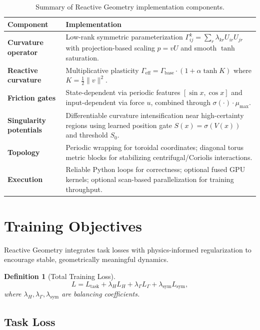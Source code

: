 \documentclass[12pt,letterpaper,twoside]{article}
\newtheorem{definition}{Definition}[section]
\begin{document}
\begin{table}[htbp]
\centering
\begin{tabular}{lp{}}
\toprule
Component & Implementation \\
\midrule
\textbf{Curvature operator} & Low-rank symmetric parameterization $\Gamma^k_{ij} = \sum_r \lambda_{kr} U_{ir} U_{jr}$ with projection-based scaling $p = vU$ and smooth $\tanh$ saturation. \\
\midrule
\textbf{Reactive curvature} & Multiplicative plasticity $\Gamma_{\text{eff}} = \Gamma_{\text{base}} \cdot (1 + \alpha \tanh K)$ where $K = \frac{1}{2}\|v\|^2$. \\
\midrule
\textbf{Friction gates} & State-dependent via periodic features $[\sin x, \cos x]$ and input-dependent via force $u$, combined through $\sigma(\cdot) \cdot \mu_{\max}$. \\
\midrule
\textbf{Singularity potentials} & Differentiable curvature intensification near high-certainty regions using learned position gate $S(x) = \sigma(V(x))$ and threshold $S_0$. \\
\midrule
\textbf{Topology} & Periodic wrapping for toroidal coordinates; diagonal torus metric blocks for stabilizing centrifugal/Coriolis interactions. \\
\midrule
\textbf{Execution} & Reliable Python loops for correctness; optional fused GPU kernels; optional scan-based parallelization for training throughput. \\
\bottomrule
\end{tabular}
\caption{Summary of Reactive Geometry implementation components.}
\label{tab:implementation}
\end{table}

\section{Training Objectives}

Reactive Geometry integrates task losses with physics-informed regularization to encourage stable, geometrically meaningful dynamics.

\begin{definition}[Total Training Loss]
\[
L = L_{\text{task}} + \lambda_H L_H + \lambda_\Gamma L_\Gamma + \lambda_{\text{sym}} L_{\text{sym}},
\]
where $\lambda_H, \lambda_\Gamma, \lambda_{\text{sym}}$ are balancing coefficients.
\end{definition}

\subsection{Task Loss}
\end{document}
